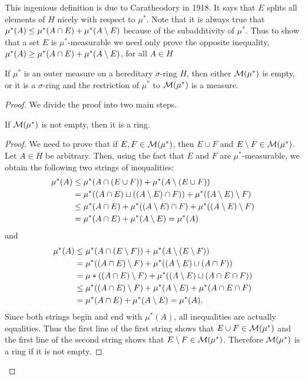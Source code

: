This ingenious definition is due to Caratheodory in 1918. It says that $E$ splits all elements of $H$ nicely with respect to $\mu^*$. Note that it is always true that $\mu^*(A) \leq \mu^*(A\cap E)+\mu^*(A\setminus E)$ because of the subadditivity of $\mu^*$. Thus to show that a set $E$ is $\mu^*$-measurable we need only prove the opposite inequality, $\mu^*(A)\geq\mu^*(A\cap E)+\mu^*(A\setminus E)$, for all $A\in H$

\begin{theorem}\label{thm:restriction of outer measure to meas sets}
If $\mu^*$ is an outer measure on a hereditary $\sigma$-ring $H$, then either ${\cal M}(\mu^*)$ is empty, or it is a $\sigma$-ring and the restriction of $\mu^*$ to ${\cal M}(\mu^*)$ is a measure.
\end{theorem}

\begin{proof}

We divide the proof into two main steps.

\begin{lemma}
If ${\cal M}(\mu^*)$ is not empty, then it is a ring.
\end{lemma}
\begin{proof}
We need to prove that if $E,F \in {\cal M}(\mu^*)$, then $E \cup F$ and $E\setminus F\in {\cal M}(\mu^*)$. Let ${A} \in {H}$ be arbitrary. Then, using the fact that $E$ and ${F}$ are $\mu^*$-measurable, we obtain the following two strings of inequalities:
\begin{align*}
    \mu^*(A)&\leq\mu^*(A \cap(E \cup F))+\mu^*(A\setminus(E \cup F)) \\
    &=\mu^*((A \cap E) \sqcup((A\setminus E) \cap F))+\mu^*((A\setminus E)\setminus F) \\
    & \leq \mu^*(A \cap E)+\mu^*((A\setminus E) \cap F)+\mu^*((A\setminus E)\setminus F) \\
    &=\mu^*(A \cap E)+\mu^*(A\setminus E)=\mu^*(A)
\end{align*}
and
\begin{align*}
\mu^*(A) & \leq \mu^*(A \cap(E\setminus F))+\mu^*(A\setminus (E\setminus F)) \\
&=\mu^*((A \cap E)\setminus F)+\mu^*((A\setminus E) \cup(A \cap F)) \\
&=\mu *((A \cap E)\setminus F)+\mu^*((A\setminus E) \sqcup(A \cap E\cap F)) \\
& \leq \mu^*((A \cap E)\setminus F)+\mu^*(A\setminus E)+\mu^*(A \cap E\cap F) \\
&=\mu^*(A \cap E)+\mu^*(A\setminus E)=\mu^*(A) .
\end{align*}
Since both strings begin and end with $\mu^*(A)$, all inequalities are actually equalities. Thus the first line of the first string shows that $E \cup F\in {\cal M}(\mu^*)$ and the first line of the second string shows that $E\setminus F\in {\cal M}(\mu^*)$. Therefore ${\cal M}(\mu^*)$ is a ring if it is not empty.
\end{proof}


\end{proof}
